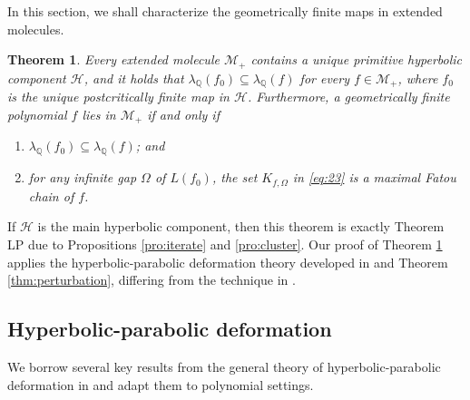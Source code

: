 \documentclass[a4paper,reqno,times, 11pt]{amsart}
\newtheorem{theorem}{Theorem}[section]
\theoremstyle{remark}
\theoremstyle{plain}
\numberwithin{equation}{section}
\newcommand{\wt}{\widetilde}
\def\MMMM{{\cal M}}
\def\MMMM{\mathscr M}
\def\HHHH{\mathscr H}
\def\Q{\mathbb Q}
\def\cal{\mathcal}
\begin{document}
	In this section, we shall characterize the geometrically finite maps in extended molecules.
	\begin{theorem}\label{thm:gf}
		Every extended molecule $\MMMM_+$ contains a unique primitive hyperbolic component $\HHHH$, and it holds that $\lambda_\Q(f_0)\subseteq \lambda_\Q(f)$ for every $f\in \MMMM_+$, where $f_0$ is the unique postcritically finite map in $\HHHH$. Furthermore, a geometrically finite polynomial $f$ lies in $\MMMM_+$ if and only if
		\begin{enumerate}
			\item $\lambda_\Q(f_0)\subseteq \lambda_\Q(f)$; and
			\item  for any infinite gap $\Omega$ of $L(f_0)$,  the set $K_{f,\Omega}$   in \eqref{eq:23} is a maximal Fatou chain of $f$.
		\end{enumerate}
		
		
		
		
		
	\end{theorem}
	
	If $\HHHH$ is the main hyperbolic component,  then this theorem is exactly Theorem LP due to Propositions \ref{pro:iterate} and \ref{pro:cluster}. Our proof of Theorem \ref{thm:gf} applies the hyperbolic-parabolic deformation theory developed in \cite{CT2} and Theorem \ref{thm:perturbation}, differing from the technique in \cite{LP}.
	
	\subsection{Hyperbolic-parabolic deformation}\label{sec:appendix}
	We borrow several key results from the general theory of hyperbolic-parabolic deformation in \cite{CT2} and adapt them to polynomial settings.
	
\end{document}
